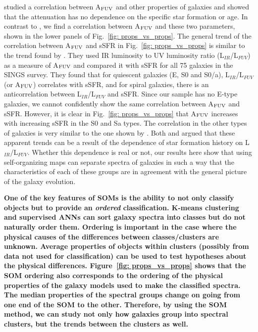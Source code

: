          studied a correlation between A$_{\rm {FUV}}$ and other properties of galaxies and showed that the attenuation has no dependence on the specific star formation or age.
        In contrast to , we find a correlation between A$_{\rm {FUV}}$ and these two parameters, shown in the lower panels of Fig.~\ref{fig: props_vs_props}.
        The general trend of the correlation between A$_{\rm {FUV}}$ and sSFR in Fig.~\ref{fig: props_vs_props} is similar to the trend found by \cite{Dale07}.
        They used IR luminosity to UV luminosity ratio (L$_{IR}$/L$_{FUV}$) as a measure of A$_{\rm {FUV}}$ and compared it with sSFR for all 75 galaxies in the SINGS survey.
        They found that for quiescent galaxies (E, S0 and S0/a), L$_{IR}$/L$_{FUV}$ (or A$_{\rm {FUV}}$) correlates with sSFR, and for spiral galaxies, there is an anticorrelation between L$_{IR}$/L$_{FUV}$ and sSFR.
        Since our sample has no E-type galaxies, we cannot confidently show the same correlation between A$_{\rm {FUV}}$ and sSFR. 
        However, it is clear in Fig.~\ref{fig: props_vs_props} that A$_{\rm {FUV}}$ increases with increasing sSFR in the S0 and Sa types.
        The correlation in the other types of galaxies is very similar to the one shown by \cite{Dale07}.
        Both \cite{Dale07} and  argued that these apparent trends can be a result of the dependence of star formation history on L$_{IR}$/L$_{FUV}$.
        Whether this dependence is real or not, our results here show that using self-organizing maps can separate spectra of galaxies in such a way that the characteristics of each of these groups are in agreement with the general picture of the galaxy evolution.
        
       \textbf{One of the key features of SOMs is the ability to not only classify objects but to provide an {\em ordered} classification.
       K-means clustering and supervised ANNs can sort galaxy spectra into classes but do not naturally order them. Ordering is important in the case where the physical causes of the differences between classes/clusters are unknown. Average properties of objects within clusters (possibly from data not used for classification) can be used to test hypotheses about the physical differences. 
       Figure~\ref{fig: props_vs_props} shows that the SOM ordering also corresponds to the ordering of the physical properties of the galaxy models used to make the classified spectra. 
       The median properties of the spectral groups change on going from one end of the SOM to the other.
       Therefore, by using the SOM method, we can study not only how galaxies group into spectral clusters, but the trends between the clusters as well.}

